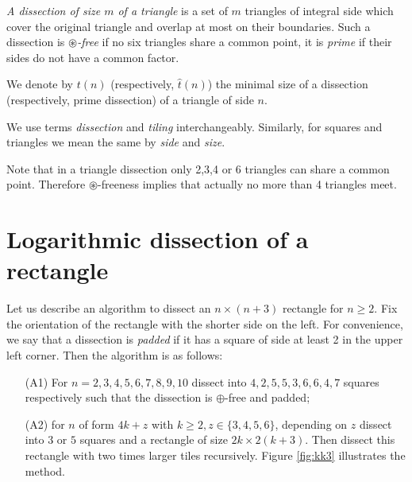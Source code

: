 \begin{defn}
\label{defn:triangle-dissection}
\emph{A dissection of size $m$ of a triangle} is a set of $m$ triangles of integral side which cover the original triangle and overlap at most on their boundaries. Such a dissection is \emph{$\circledast$-free} if no six triangles share a common point, it is \emph{prime} if their sides do not have a common factor.

We denote by $t(n)$ (respectively, $\hat t(n)$) the minimal size of a dissection (respectively, prime dissection) of a triangle of side $n$.
\end{defn}

We use terms \emph{dissection} and \emph{tiling} interchangeably. Similarly, for squares and triangles we mean the same by \emph{side} and \emph{size}.

Note that in a triangle dissection only 2,3,4 or 6 triangles can share a common point. Therefore $\circledast$-freeness implies that actually no more than 4 triangles meet.


\section{Logarithmic dissection of a rectangle}
\label{sec:log-rectangle}

Let us describe an algorithm to dissect an $n \times (n+3)$ rectangle for $n \geq 2$. Fix the orientation of the rectangle with the shorter side on the left. For convenience, we say that a dissection is \emph{padded} if it has a square of side at least 2 in the upper left corner. Then the algorithm is as follows:

\begin{enumerate}
	\item[(A1)] For $n=2,3,4,5,6,7,8,9,10$ dissect into $4,2,5,5,3,6,6,4,7$ squares respectively such that the dissection is $\oplus$-free and padded;
	\item[(A2)] for $n$ of form $4k+z$ with $k \geq 2, z \in \{3,4,5,6\}$, depending on $z$ dissect into $3$ or $5$ squares and a rectangle of size $2k \times 2(k+3)$. Then dissect this rectangle with two times larger tiles recursively. Figure \ref{fig:kk3} illustrates the method.
\end{enumerate}

